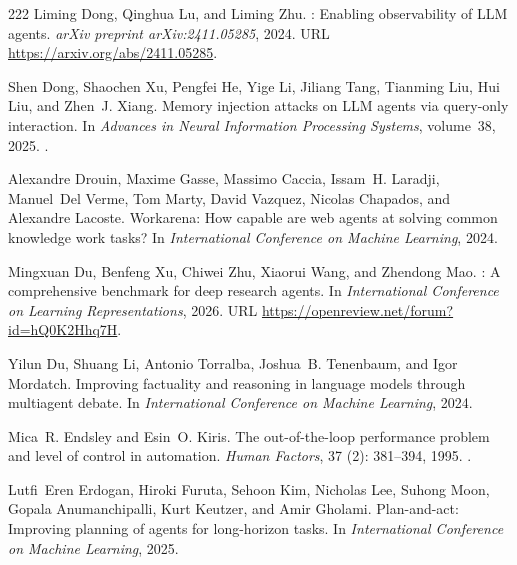 \begin{thebibliography}{222}
Liming Dong, Qinghua Lu, and Liming Zhu.
: Enabling observability of {LLM} agents.
\newblock \emph{arXiv preprint arXiv:2411.05285}, 2024.
\newblock URL \url{https://arxiv.org/abs/2411.05285}.

Shen Dong, Shaochen Xu, Pengfei He, Yige Li, Jiliang Tang, Tianming Liu, Hui
  Liu, and Zhen~J. Xiang.
\newblock Memory injection attacks on {LLM} agents via query-only interaction.
\newblock In \emph{Advances in Neural Information Processing Systems},
  volume~38, 2025.
\newblock {}.

Alexandre Drouin, Maxime Gasse, Massimo Caccia, Issam~H. Laradji, Manuel~Del
  Verme, Tom Marty, David Vazquez, Nicolas Chapados, and Alexandre Lacoste.
\newblock Workarena: How capable are web agents at solving common knowledge
  work tasks?
\newblock In \emph{International Conference on Machine Learning}, 2024.

Mingxuan Du, Benfeng Xu, Chiwei Zhu, Xiaorui Wang, and Zhendong Mao.
: A comprehensive benchmark for deep research
  agents.
\newblock In \emph{International Conference on Learning Representations}, 2026.
\newblock URL \url{https://openreview.net/forum?id=hQ0K2Hhq7H}.

Yilun Du, Shuang Li, Antonio Torralba, Joshua~B. Tenenbaum, and Igor Mordatch.
\newblock Improving factuality and reasoning in language models through
  multiagent debate.
\newblock In \emph{International Conference on Machine Learning}, 2024.

Mica~R. Endsley and Esin~O. Kiris.
\newblock The out-of-the-loop performance problem and level of control in
  automation.
\newblock \emph{Human Factors}, 37 (2): 381--394, 1995.
\newblock {}.

Lutfi~Eren Erdogan, Hiroki Furuta, Sehoon Kim, Nicholas Lee, Suhong Moon,
  Gopala Anumanchipalli, Kurt Keutzer, and Amir Gholami.
\newblock Plan-and-act: Improving planning of agents for long-horizon tasks.
\newblock In \emph{International Conference on Machine Learning}, 2025.


\end{thebibliography}
